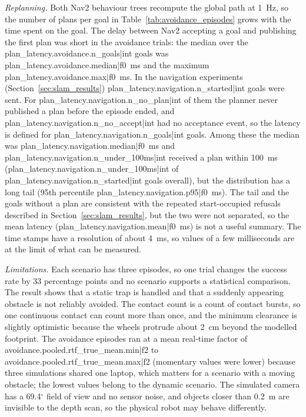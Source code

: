 \noindent\textit{Replanning.} Both Nav2 behaviour trees recompute the global path at 1~Hz, so the number of plans per goal in Table~\ref{tab:avoidance_episodes} grows with the time spent on the goal. The delay between Nav2 accepting a goal and publishing the first plan was short in the avoidance trials: the median over the {{plan_latency.avoidance.n_goals|int}} goals was {{plan_latency.avoidance.median|f0}}~ms and the maximum {{plan_latency.avoidance.max|f0}}~ms. In the navigation experiments (Section~\ref{sec:slam_results}) {{plan_latency.navigation.n_started|int}} goals were sent. For {{plan_latency.navigation.n_no_plan|int}} of them the planner never published a plan before the episode ended, and {{plan_latency.navigation.n_no_accept|int}} had no acceptance event, so the latency is defined for {{plan_latency.navigation.n_goals|int}} goals. Among these the median was {{plan_latency.navigation.median|f0}}~ms and {{plan_latency.navigation.n_under_100ms|int}} received a plan within 100~ms ({{plan_latency.navigation.n_under_100ms|int}} of {{plan_latency.navigation.n_started|int}} goals overall), but the distribution has a long tail (95th percentile {{plan_latency.navigation.p95|f0}}~ms). The tail and the goals without a plan are consistent with the repeated start-occupied refusals described in Section~\ref{sec:slam_results}, but the two were not separated, so the mean latency ({{plan_latency.navigation.mean|f0}}~ms) is not a useful summary. The time stamps have a resolution of about 4~ms, so values of a few milliseconds are at the limit of what can be measured.

\noindent\textit{Limitations.} Each scenario has three episodes, so one trial changes the success rate by 33 percentage points and no scenario supports a statistical comparison. The result shows that a static trap is handled and that a suddenly appearing obstacle is not reliably avoided. The contact count is a count of contact bursts, so one continuous contact can count more than once, and the minimum clearance is slightly optimistic because the wheels protrude about 2~cm beyond the modelled footprint. The avoidance episodes ran at a mean real-time factor of {{avoidance.pooled.rtf_true_mean.min|f2}} to {{avoidance.pooled.rtf_true_mean.max|f2}} (momentary values were lower) because three simulations shared one laptop, which matters for a scenario with a moving obstacle; the lowest values belong to the dynamic scenario. The simulated camera has a 69.4$^{\circ}$ field of view and no sensor noise, and objects closer than 0.2~m are invisible to the depth scan, so the physical robot may behave differently.

